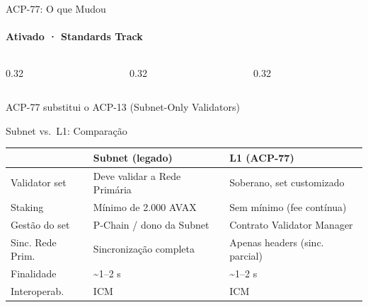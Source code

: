 \documentclass[aspectratio=169]{beamer}
\begin{document}
\begin{frame}{ACP-77: O que Mudou}
	\framesubtitle{Ativado · Standards Track}

	\begin{columns}[t]
		\begin{column}{0.32\textwidth}
		\end{column}
		\begin{column}{0.32\textwidth}
		\end{column}
		\begin{column}{0.32\textwidth}
		\end{column}
	\end{columns}

	\vspace{0.5em}
	\begin{center}
		\small\textcolor{avagraydark}{ACP-77 substitui o ACP-13 (Subnet-Only Validators)}
	\end{center}
\end{frame}

\begin{frame}{Subnet vs.\ L1: Comparação}
	\begin{center}
	\renewcommand{\arraystretch}{1.4}
	\begin{tabular}{@{} l >{\raggedright}p{4.5cm} >{\raggedright\arraybackslash}p{4.5cm} @{}}
		\toprule
		& \textbf{Subnet (legado)} & \textbf{L1 (ACP-77)} \\
		\midrule
		Validator set    & Deve validar a Rede Primária  & Soberano, set customizado \\
		Staking          & Mínimo de 2.000 AVAX          & Sem mínimo (fee contínua) \\
		Gestão do set    & P-Chain / dono da Subnet      & Contrato Validator Manager \\
		Sinc. Rede Prim. & Sincronização completa        & Apenas headers (sinc. parcial) \\
		Finalidade       & \textasciitilde1--2 s         & \textasciitilde1--2 s \\
		Interoperab.     & ICM                           & ICM \\
		\bottomrule
	\end{tabular}
	\end{center}
\end{frame}
\end{document}

